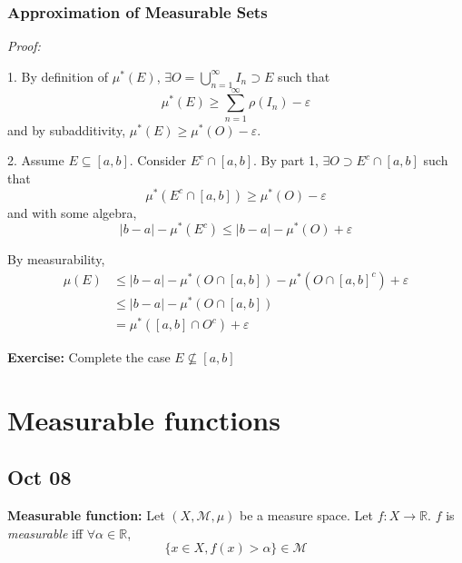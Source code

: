 \documentclass[12pt]{report}
\newcommand{\R}{\mathbb{R}}
\newcommand{\abs}[1]{\left\vert #1 \right\vert}
\newcommand{\ep}{\varepsilon}
\newcommand{\M}{\mathcal{M}}
\newcommand{\sub}{\subseteq}
\newenvironment*{tbox}[2][gray]{
    \begin{tcolorbox}[
        parbox=false,
        colback=#1!5!white,
        colframe=#1!75!black,
        breakable,
        title={#2}
    ]}
    {\end{tcolorbox}}
\newenvironment*{exercise}[1][red]{
    \begin{tcolorbox}[
        parbox=false,
        colback=#1!5!white,
        colframe=#1!75!black,
        breakable
    ]}
    {\end{tcolorbox}}
\begin{document}
\subsection*{Approximation of Measurable Sets}
    \begin{tbox}{\textbf{Lemma:} 
        \begin{enumerate}
            \item (Approximation from Above) $\forall E \sub P(X)$ and $\forall \ep > 0$, then exists an open set $O$ such that $E \sub O$ and 
            \[\mu(O) \geq \mu^*(E) \geq \mu(O) - \ep\]
            \item (Approximation from Below) $\forall E \sub \M$ and $\forall \ep > 0$, $\exists K$ closed such that 
            \[\mu(K) \leq \mu(E) \leq \mu(K) + \ep\] 
        \end{enumerate}}
        \emph{Proof:} 

        1. By definition of $\mu^*(E)$, $\exists O = \bigcup_{n=1}^\infty I_n \supset E$ such that 
        \[\mu^*(E) \geq \sum_{n=1}^{\infty} \rho(I_n) - \ep\] 
        and by subadditivity, $\mu^*(E) \geq \mu^*(O) - \ep$. 
        
        2. Assume $E \sub [a, b]$. Consider $E^c \cap [a, b]$. By part 1, $\exists O \supset E^c \cap [a, b]$ such that 
        \[\mu^*(E^c \cap [a, b]) \geq \mu^*(O) - \ep\]
        and with some algebra, 
        \[\abs{b - a} - \mu^*(E^c) \leq \abs{b - a} - \mu^*(O) + \ep\]

        By measurability, 
        \begin{align*}
            \mu(E) &\leq \abs{b - a} - \mu^*(O \cap [a, b]) - \mu^*(O \cap [a, b]^c) + \ep\\ 
            &\leq \abs{b - a} - \mu^*(O \cap [a, b])\\ 
            &= \mu^*([a, b] \cap O^c) + \ep
        \end{align*}

        \begin{exercise}
            \textbf{Exercise:} Complete the case $E \not\sub [a, b]$
        \end{exercise}
    \end{tbox}

\chapter{Measurable functions}
\section{Oct 08}
    \textbf{Measurable function:} Let $(X, \M, \mu)$ be a measure space. Let $f: X \to \R$. $f$ is \emph{measurable} iff $\forall \alpha \in \R$, 
    \[\{x \in X, f(x) > \alpha\} \in \M\] 
\end{document}
